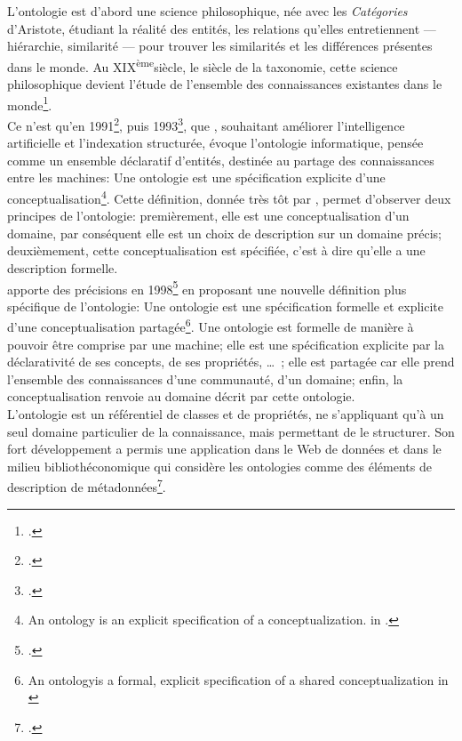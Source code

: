 L'ontologie est d'abord une science philosophique, née avec les \textit{Catégories} d'Aristote, étudiant la réalité des entités, les relations qu'elles entretiennent --- hiérarchie, similarité --- pour trouver les similarités et les différences présentes dans le monde. Au \textsc{XIX}\textsuperscript{ème}siècle, le siècle de la taxonomie, cette science philosophique devient l'étude de l'ensemble des connaissances existantes dans le monde\footcite{welty_supporting_2011}.\\

Ce n'est qu'en 1991\footcite{gruber_role_1991}, puis 1993\footcite{gruber_toward_1993}, que , souhaitant améliorer l'intelligence artificielle et l'indexation structurée, évoque l'ontologie informatique, pensée comme un ensemble déclaratif d'entités, destinée au partage des connaissances entre les machines: \og Une ontologie est une spécification explicite d’une conceptualisation\fg{}\footnote{\og An ontology is an explicit specification of a conceptualization. \fg{} in \cite[p.1]{gruber_toward_1993}.}. Cette définition, donnée très tôt par , permet d'observer deux principes de l'ontologie: premièrement, elle est une conceptualisation d'un domaine, par conséquent elle est un choix de description sur un domaine précis; deuxièmement, cette conceptualisation est spécifiée, c'est à dire qu'elle a une description formelle.\\

 apporte des précisions en 1998\footcite{studer_knowledge_1998} en proposant une nouvelle définition plus spécifique de l'ontologie: \og Une ontologie est
une spécification formelle et explicite d’une conceptualisation partagée\fg{}\footnote{\og An ontologyis a formal, explicit specification of a shared conceptualization\fg{} in \cite{studer_knowledge_1998}}. Une ontologie est formelle de manière à pouvoir être comprise par une machine; elle est une spécification explicite par la déclarativité de ses concepts, de ses propriétés, \dots~; elle est partagée car elle prend l'ensemble des connaissances d'une communauté, d'un domaine; enfin, la conceptualisation renvoie au domaine décrit par cette ontologie.\\

L'ontologie est un référentiel de classes et de propriétés, ne s'appliquant qu'à un seul domaine particulier de la connaissance, mais permettant de le structurer. Son fort développement a permis une application dans le Web de données et dans le milieu bibliothéconomique qui considère les ontologies comme \og des éléments de description de métadonnées\fg{}\footcite{baker_rapport_2012}.

